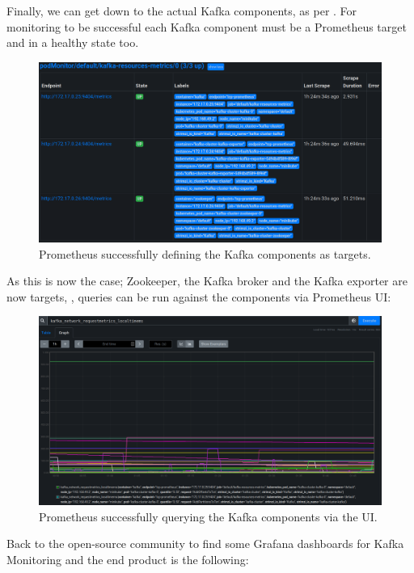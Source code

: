 Finally, we can get down to the actual Kafka components, as per . For monitoring to be
successful each Kafka component must be a Prometheus target and in a healthy state too.
\begin{figure}[H]
	\centering
	\includegraphics[width=1\linewidth]{figures/prom_target_strimzi_kafka_components.png}
	\caption{Prometheus successfully defining the Kafka components as targets.}
	\label{fig:prom_target_strimzi_kafka_components}
\end{figure}
As this is now the case; Zookeeper, the Kafka broker and the Kafka exporter are now targets, , queries
can be run against the components via Prometheus UI:
\begin{figure}[H]
	\centering
	\includegraphics[width=0.9\linewidth]{figures/prom_kafka_query.png}
	\caption{Prometheus successfully querying the Kafka components via the UI.}
	\label{fig:prom_ui_strimzi_kafka_components}
\end{figure}
Back to the open-source community to find some Grafana dashboards for Kafka Monitoring and the end product is the following:
